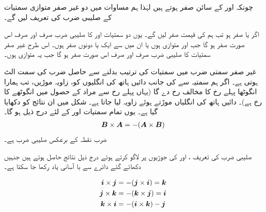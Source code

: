 چونکہ  اور  کے سائن صفر ہوتے ہیں لہٰذا ہم مساوات  میں دو غیر صفر متوازی سمتیات کے صلیبی ضرب کی تعریف  لیں گے۔

اگر  یا  صفر ہو تب ہم  کی قیمت صفر لیں گے۔ یوں دو سمتیات  اور  کا صلیبی ضرب صرف اور صرف اس صورت صفر ہو گا جب  اور  متوازی ہوں یا ان میں سے ایک یا دونوں صفر ہوں۔ اس طرح غیر صفر سمتیات کا صلیبی ضرب صرف اور صرف اس صورت صفر ہو گا جب یہ متوازی ہوں۔

غیر صفر سمتی ضرب میں سمتیات کی ترتیب بدلنے سے حاصل ضرب کی سمت الٹ ہوتی ہے۔ اگر ہم سمتیہ  سے  کی جانب دائیں ہاتھ کی انگلیوں کو، زاویہ   موڑیں، تب ہمارا انگوٹھا پہلے رخ کا مخالف رخ دے گا (یہاں پہلے رخ سے مراد  کے حصول میں انگوٹھے کا رخ ہے)۔ دائیں ہاتھ کی انگلیاں موڑتے ہوئے زاویہ  لیا جاتا ہے۔  شکل  میں ان نتائج کو دکھایا گیا ہے۔ یوں تمام سمتیات  اور  کے لئے درج ذیل ہو گا۔
\begin{align}
{\ensuremath{{\boldsymbol{B}}}}\times{\ensuremath{{\boldsymbol{A}}}}=-({{\boldsymbol{A}}}\times{\ensuremath{{\boldsymbol{B}}}})
\end{align}
ضرب نقطہ کے برعکس صلیبی ضرب  ہے۔

صلیبی ضرب کی تعریف ،  اور  کی جوڑیوں پر لاگو کرتے ہوئے درج ذیل نتائج حاصل ہوتے ہیں جنہیں دکھائے گئے دائرے سے با آسانی یاد رکھا جا سکتا ہے۔

\begin{minipage}{0.25\textwidth}
\centering
{}
\end{minipage}\hfill
\begin{minipage}{0.65\textwidth}
\centering
\begin{gather}
\begin{aligned}
{\boldsymbol{i}}\times{\boldsymbol{j}}&=-({\boldsymbol{j}}\times{\boldsymbol{i}})={\boldsymbol{k}}\\
{\boldsymbol{j}}\times{\boldsymbol{k}}&=-({\boldsymbol{k}}\times{\boldsymbol{j}})={\boldsymbol{i}}\\
{\boldsymbol{k}}\times{\boldsymbol{i}}&=-({\boldsymbol{i}}\times{\boldsymbol{k}})-{\boldsymbol{j}}
\end{aligned}
\end{gather}
\end{minipage}

